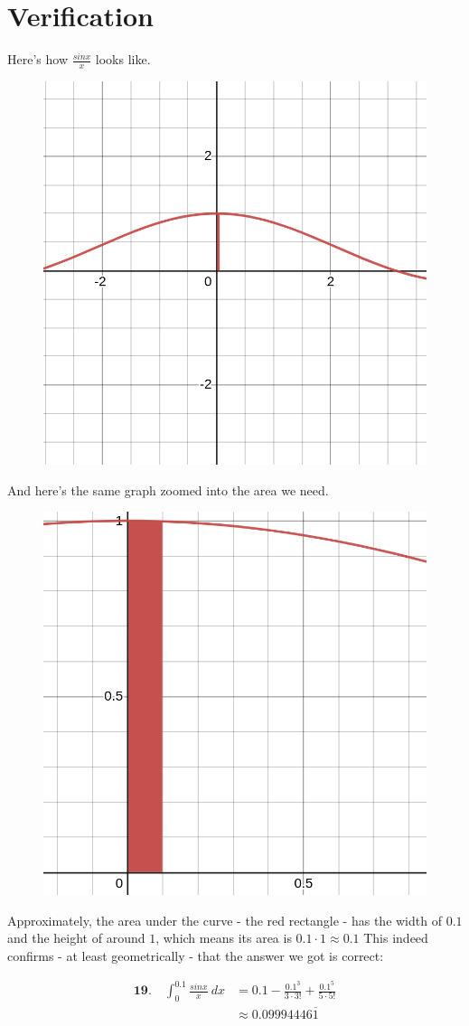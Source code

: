 \newpage

\section*{Verification}

Here's how $ \frac{sinx}{x} $
looks like.

\begin{figure}
	\centering
	\includegraphics[width=0.43\linewidth]{verification1}
	\caption{}
	\label{fig:verification1}
\end{figure}

And here's the same graph
zoomed into the area we need.

\begin{figure}
	\centering
	\includegraphics[width=0.43\linewidth]{verification2}
	\caption{}
	\label{fig:verification2}
\end{figure}

Approximately, the area under
the curve - the red rectangle -
has the width of
$ 0.1 $ and the height of 
around $ 1 $, which means its
area is $ 0.1 \cdot 1 \approx 0.1 $
This indeed confirms - at least
geometrically - that the answer we 
got is correct:

\begin{align}
	\textbf{19.}\quad \int_{0}^{0.1} 
	\frac{sinx}{x}\ dx
	&=
	0.1 
	-
	\frac{
		0.1^{3}
	}{
		3\cdot3!
	}
	+
	\frac{
		0.1^{5}
	}{
		5\cdot5!
	} \\
	&\approx
	0.09994446\overline{1}
\end{align}


